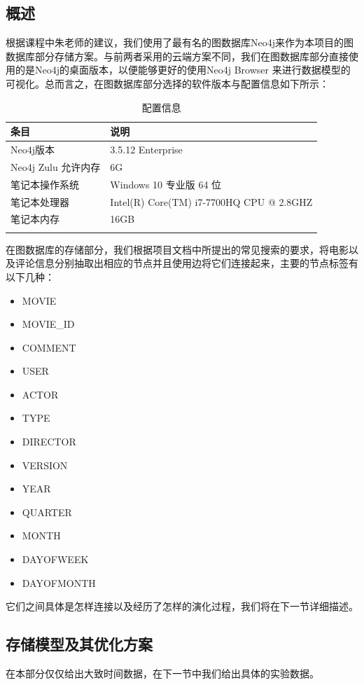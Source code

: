 \documentclass{ctexrep}
\begin{document}
	\subsection{概述}
	根据课程中朱老师的建议，我们使用了最有名的图数据库Neo4j来作为本项目的图数据库部分存储方案。与前两者采用的云端方案不同，我们在图数据库部分直接使用的是Neo4j的桌面版本，以便能够更好的使用Neo4j Browser 来进行数据模型的可视化。总而言之，在图数据库部分选择的软件版本与配置信息如下所示：
	\begin{longtable}{l|l}
		\hline
		条目 & 说明\\
		\hline
		\hline
		Neo4j版本 & 3.5.12 Enterprise\\
		Neo4j Zulu 允许内存 & 6G \\
		\hline
		笔记本操作系统 & Windows 10 专业版 64 位 \\
		笔记本处理器 & Intel(R) Core(TM) i7-7700HQ CPU @ 2.8GHZ \\
		笔记本内存 & 16GB\\
		\hline
		\caption{配置信息}
	\end{longtable}
	在图数据库的存储部分，我们根据项目文档中所提出的常见搜索的要求，将电影以及评论信息分别抽取出相应的节点并且使用边将它们连接起来，主要的节点标签有以下几种：\begin{itemize}
	  	\item MOVIE
	  	\item MOVIE\_ID
	  	\item COMMENT
	  	\item USER
	  	\item ACTOR
	  	\item TYPE
	  	\item DIRECTOR
	  	\item VERSION
	  	\item YEAR
	  	\item QUARTER
	  	\item MONTH
	  	\item DAYOFWEEK
	  	\item DAYOFMONTH
	\end{itemize}
	它们之间具体是怎样连接以及经历了怎样的演化过程，我们将在下一节详细描述。
	\subsection{存储模型及其优化方案}
	在本部分仅仅给出大致时间数据，在下一节中我们给出具体的实验数据。
\end{document}
